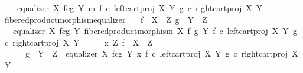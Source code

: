 \begin{isabellebody}
\ \ \ \ equalizer\ {\isacharparenleft}{\kern0pt}X\ \isactrlbsub f\isactrlesub {\isasymtimes}\isactrlsub c\isactrlbsub g\isactrlesub \ Y{\isacharparenright}{\kern0pt}\ m\ {\isacharparenleft}{\kern0pt}f\ {\isasymcirc}\isactrlsub c\ left{\isacharunderscore}{\kern0pt}cart{\isacharunderscore}{\kern0pt}proj\ X\ Y{\isacharparenright}{\kern0pt}\ {\isacharparenleft}{\kern0pt}g\ {\isasymcirc}\isactrlsub c\ right{\isacharunderscore}{\kern0pt}cart{\isacharunderscore}{\kern0pt}proj\ X\ Y{\isacharparenright}{\kern0pt}{\isacharparenright}{\kern0pt}{\isachardoublequoteclose}\isanewline
\isanewline
{}\isamarkupfalse%
\ fibered{\isacharunderscore}{\kern0pt}product{\isacharunderscore}{\kern0pt}morphism{\isacharunderscore}{\kern0pt}equalizer{\isacharcolon}{\kern0pt}\isanewline
\ \ \ {\isachardoublequoteopen}f\ {\isacharcolon}{\kern0pt}\ X\ {\isasymrightarrow}\ Z{\isachardoublequoteclose}\ {\isachardoublequoteopen}g\ {\isacharcolon}{\kern0pt}\ Y\ {\isasymrightarrow}\ Z{\isachardoublequoteclose}\isanewline
\ \ \ {\isachardoublequoteopen}equalizer\ {\isacharparenleft}{\kern0pt}X\ \isactrlbsub f\isactrlesub {\isasymtimes}\isactrlsub c\isactrlbsub g\isactrlesub \ Y{\isacharparenright}{\kern0pt}\ {\isacharparenleft}{\kern0pt}fibered{\isacharunderscore}{\kern0pt}product{\isacharunderscore}{\kern0pt}morphism\ X\ f\ g\ Y{\isacharparenright}{\kern0pt}\ {\isacharparenleft}{\kern0pt}f\ {\isasymcirc}\isactrlsub c\ left{\isacharunderscore}{\kern0pt}cart{\isacharunderscore}{\kern0pt}proj\ X\ Y{\isacharparenright}{\kern0pt}\ {\isacharparenleft}{\kern0pt}g\ {\isasymcirc}\isactrlsub c\ right{\isacharunderscore}{\kern0pt}cart{\isacharunderscore}{\kern0pt}proj\ X\ Y{\isacharparenright}{\kern0pt}{\isachardoublequoteclose}\isanewline
%
\isadelimproof
%
\endisadelimproof
%
\isatagproof
{}\isamarkupfalse%
\ {\isacharminus}{\kern0pt}\isanewline
\ \ \isamarkupfalse%
\ {\isachardoublequoteopen}{\isasymexists}x\ Z{\isachardot}{\kern0pt}\ f\ {\isacharcolon}{\kern0pt}\ X\ {\isasymrightarrow}\ Z\ {\isasymand}\isanewline
\ \ \ \ \ \ g\ {\isacharcolon}{\kern0pt}\ Y\ {\isasymrightarrow}\ Z\ {\isasymand}\ equalizer\ {\isacharparenleft}{\kern0pt}X\ \isactrlbsub f\isactrlesub {\isasymtimes}\isactrlsub c\isactrlbsub g\isactrlesub \ Y{\isacharparenright}{\kern0pt}\ x\ {\isacharparenleft}{\kern0pt}f\ {\isasymcirc}\isactrlsub c\ left{\isacharunderscore}{\kern0pt}cart{\isacharunderscore}{\kern0pt}proj\ X\ Y{\isacharparenright}{\kern0pt}\ {\isacharparenleft}{\kern0pt}g\ {\isasymcirc}\isactrlsub c\ right{\isacharunderscore}{\kern0pt}cart{\isacharunderscore}{\kern0pt}proj\ X\ Y{\isacharparenright}{\kern0pt}{\isachardoublequoteclose}\isanewline

\end{isabellebody}
